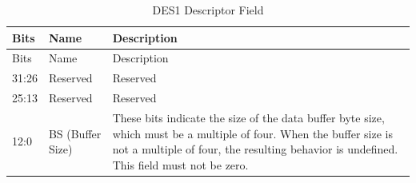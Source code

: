 
\begin{longtable}[c]{ |p{3cm}|p{4cm}|p{8cm}| }
\caption{DES1 Descriptor Field} \label{tab:sdhost-DES1}\\
\hline
\rowcolor{lightgray}
Bits &Name & Description \\
\hline
\endfirsthead
\hline
\rowcolor{lightgray}
Bits &Name & Description  \\
\hline
\endhead
\endfoot

31:26 & Reserved& Reserved  \\\hline
25:13 & Reserved& Reserved  \\\hline
\multirow{4}{*}{12:0}  & \multirow{4}{*}{BS (Buffer Size)} &  These bits indicate the size of the data buffer byte size, which must be a multiple of four. When the buffer size is not a multiple of four, the resulting behavior is undefined. This field must not be zero.    \\\hline

\end{longtable}
